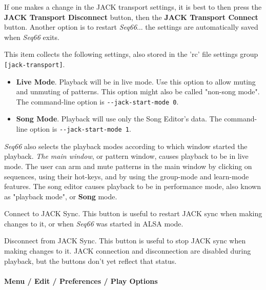    If one makes a change in the JACK transport settings, it is best to
   then press the \textbf{JACK Transport Disconnect} button, then the
   \textbf{JACK Transport Connect} button.
   Another option is to restart
   \textsl{Seq66}... the settings are automatically saved when
   \textsl{Seq66} exits.

   This item collects the following settings, also stored in the 'rc' file
   settings group \texttt{[jack-transport]}.

   \begin{itemize}
      \item \textbf{Live Mode}.
         Playback will be in live mode.  Use this option to allow muting and
         unmuting of patterns.  This option might also be called "non-song
         mode".
         The command-line option is \texttt{-{}-jack-start-mode 0}.
      \item \textbf{Song Mode}.
         Playback will use only the Song Editor's data.
         The command-line option is \texttt{-{}-jack-start-mode 1}.
   \end{itemize}

   \textsl{Seq66} also selects the playback modes
   according to which window started the playback.
   \textsl{The main window}, or pattern
   window, causes playback to be in live mode.  The user can arm and mute
   patterns in the main window by clicking on sequences, using their hot-keys,
   and by using the group-mode and learn-mode features.
   The song editor causes playback to be in performance mode, also known as
   "playback mode", or \textbf{Song} mode.

   Connect to JACK Sync.
   This button is useful to restart JACK sync when making changes to it,
   or when \textsl{Seq66} was started in ALSA mode.

   Disconnect from JACK Sync.
   This button is useful to stop JACK sync when making changes to it.
   JACK connection and disconnection are disabled during playback, but the
   buttons don't yet reflect that status.

\paragraph{Menu / Edit / Preferences / Play Options}
\label{paragraph:menu_edit_preferences_play_options}

